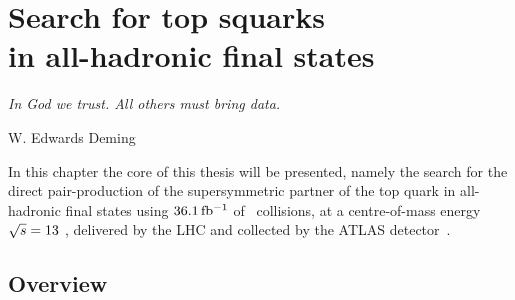 \chapter[Search for top squarks in all-hadronic final states]{Search for top squarks \protect\\in all-hadronic final states}
\label{ch:stop_ana}
\epigraph{\emph{In God we trust. All others must bring data.}}{W. Edwards Deming}

	In this chapter the core of this thesis will be presented, namely the search for the direct pair-production of the supersymmetric partner of the top quark in all-hadronic final states using $36.1\, \mbox{fb$^{-1}$}$ of \pp\ collisions, at a centre-of-mass energy $\sqrt{s} = 13$ \TeV, delivered by the \ac{LHC} and collected by the \ac{ATLAS} detector~\cite{stop0L}. 

	\section{Overview}





			
			






